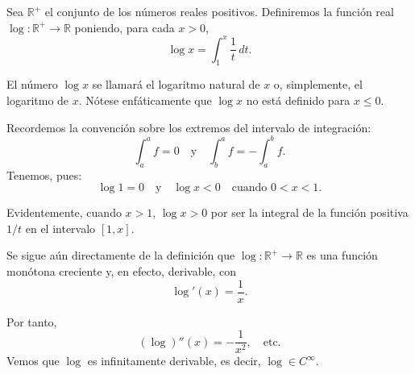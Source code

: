 \documentclass[12pt,oneside]{book}
\begin{document}
Sea \(\mathbb{R}^+\) el conjunto de los números reales positivos. Definiremos la función real \(\log: \mathbb{R}^+ \to \mathbb{R}\) poniendo, para cada \(x > 0\),
\[
\log x = \int_1^x \frac{1}{t} \, dt.
\]

El número \(\log x\) se llamará el logaritmo natural de \(x\) o, simplemente, el logaritmo de \(x\). Nótese enfáticamente que \(\log x\) no está definido para \(x \leq 0\).

Recordemos la convención sobre los extremos del intervalo de integración:
\[
\int_a^a f = 0 \quad \text{y} \quad \int_b^a f = - \int_a^b f.
\]
Tenemos, pues:
\[
\log 1 = 0 \quad \text{y} \quad \log x < 0 \quad \text{cuando } 0 < x < 1.
\]

Evidentemente, cuando \(x > 1\), \(\log x > 0\) por ser la integral de la función positiva \(1/t\) en el intervalo \([1, x]\).

Se sigue aún directamente de la definición que \(\log: \mathbb{R}^+ \to \mathbb{R}\) es una función monótona creciente y, en efecto, derivable, con
\[
\log'(x) = \frac{1}{x}.
\]

Por tanto,
\[
(\log)''(x) = -\frac{1}{x^2}, \quad \text{etc.}
\]
Vemos que \(\log\) es infinitamente derivable, es decir, \(\log \in C^\infty\).

\begin{center}
\end{center}
\end{document}
